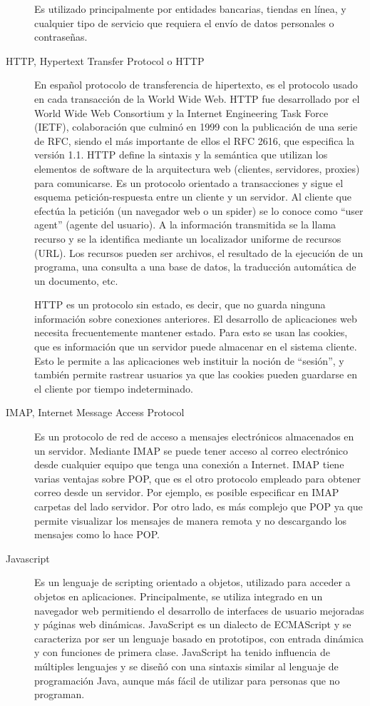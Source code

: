 \begin{description}
Es utilizado principalmente por entidades bancarias, tiendas en línea, y cualquier tipo de servicio que requiera el envío de datos personales o contraseñas.

\item[HTTP, Hypertext Transfer Protocol o HTTP]
En español protocolo de transferencia de hipertexto, es el protocolo  usado en cada transacción de la World Wide Web. HTTP fue desarrollado por el World Wide Web Consortium y la Internet Engineering Task Force (IETF), colaboración que culminó en 1999 con la publicación de una serie de RFC, siendo el más importante de ellos el RFC 2616, que especifica la versión 1.1. HTTP define la sintaxis y la semántica que utilizan los elementos de software de la arquitectura web (clientes, servidores, proxies) para comunicarse. Es un protocolo orientado a transacciones y sigue el esquema petición-respuesta entre un cliente y un servidor. Al cliente que efectúa la petición (un navegador web o un spider) se lo conoce como ``user agent'' (agente del usuario). A la información transmitida se la llama recurso y se la identifica mediante un localizador uniforme de recursos (URL). Los recursos pueden ser archivos, el resultado de la ejecución de un programa, una consulta a una base de datos, la traducción automática de un documento, etc.

HTTP es un protocolo sin estado, es decir, que no guarda ninguna información sobre conexiones anteriores. El desarrollo de aplicaciones web necesita frecuentemente mantener estado. Para esto se usan las cookies, que es información que un servidor puede almacenar en el sistema cliente. Esto le permite a las aplicaciones web instituir la noción de ``sesión'', y también permite rastrear usuarios ya que las cookies pueden guardarse en el cliente por tiempo indeterminado.

\item[IMAP, Internet Message Access Protocol]
Es un protocolo de red de acceso a mensajes electrónicos almacenados en un servidor. Mediante IMAP se puede tener acceso al correo electrónico desde cualquier equipo que tenga una conexión a Internet. IMAP tiene varias ventajas sobre POP, que es el otro protocolo empleado para obtener correo desde un servidor. Por ejemplo, es posible especificar en IMAP carpetas del lado servidor. Por otro lado, es más complejo que POP ya que permite visualizar los mensajes de manera remota y no descargando los mensajes como lo hace POP.

\item[Javascript]
Es un lenguaje de scripting orientado a objetos, utilizado para acceder a objetos en aplicaciones. Principalmente, se utiliza integrado en un navegador web permitiendo el desarrollo de interfaces de usuario mejoradas y páginas web dinámicas. JavaScript es un dialecto de ECMAScript  y se caracteriza por ser un lenguaje basado en prototipos, con entrada dinámica y con funciones de primera clase. JavaScript ha tenido influencia de múltiples lenguajes y se diseñó con una sintaxis similar al lenguaje de programación Java, aunque más fácil de utilizar para personas que no programan.


\end{description}
